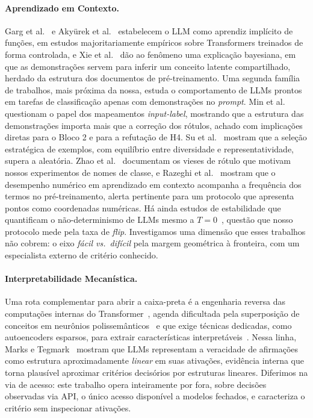 \documentclass[12pt,a4paper]{article}
\begin{document}
\paragraph{Aprendizado em Contexto.}
Garg et al.~\cite{gargWhatTransformers2022} e Akyürek et al.~\cite{akyurekWhatLearning2023}
estabelecem o LLM como aprendiz implícito de funções, em estudos majoritariamente
empíricos sobre Transformers treinados de forma controlada, e Xie et
al.~\cite{xieExplanationInContext2022} dão ao fenômeno uma explicação bayesiana, em que as
demonstrações servem para inferir um conceito latente compartilhado, herdado da estrutura
dos documentos de pré-treinamento. Uma segunda família de
trabalhos, mais próxima da nossa, estuda o comportamento de LLMs prontos em tarefas de
classificação apenas com demonstrações no \emph{prompt}. Min et
al.~\cite{minRethinkingRole2022} questionam o papel dos mapeamentos \emph{input-label},
mostrando que a estrutura das demonstrações importa mais que a correção dos rótulos, achado
com implicações diretas para o Bloco 2 e para a refutação de H4. Su et
al.~\cite{suSelectiveAnnotation2023} mostram que a seleção estratégica de exemplos, com
equilíbrio entre diversidade e representatividade, supera a aleatória. Zhao et
al.~\cite{zhaoCalibrateBefore2021} documentam os vieses de rótulo que motivam nossos
experimentos de nomes de classe, e Razeghi et al.~\cite{razeghiImpactPretraining2022}
mostram que o desempenho numérico em aprendizado em contexto acompanha a frequência dos
termos no pré-treinamento, alerta pertinente para um protocolo que apresenta pontos como
coordenadas numéricas. Há ainda estudos de estabilidade que quantificam o
não-determinismo de LLMs mesmo a $T=0$~\cite{atilLLMStability2024, windischOneRun2026},
questão que nosso protocolo mede pela taxa de \emph{flip}. Investigamos uma
dimensão que esses trabalhos não cobrem: o eixo \emph{fácil vs.\ difícil} pela margem
geométrica à fronteira, com um especialista externo de critério conhecido.

\paragraph{Interpretabilidade Mecanística.}
Uma rota complementar para abrir a caixa-preta é a engenharia reversa das computações
internas do Transformer~\cite{elhageMathematicalFramework2021}, agenda dificultada pela
superposição de conceitos em neurônios polissemânticos~\cite{elhageToyModels2022} e que
exige técnicas dedicadas, como autoencoders esparsos, para extrair características
interpretáveis~\cite{brickenMonosemanticity2023}. Nessa linha, Marks e
Tegmark~\cite{marksGeometryTruth2024} mostram que LLMs representam a veracidade de
afirmações como estrutura aproximadamente \emph{linear} em suas ativações, evidência
interna que torna plausível aproximar critérios decisórios por estruturas lineares.
Diferimos na via de acesso: este trabalho opera inteiramente por fora, sobre decisões
observadas via API, o único acesso disponível a modelos fechados, e caracteriza o critério
sem inspecionar ativações.
\end{document}
